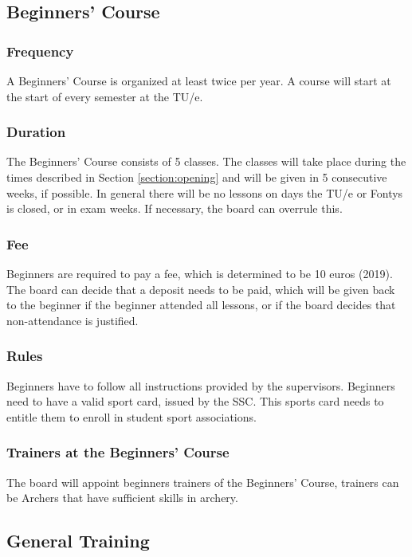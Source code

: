 \documentclass[a4paper]{article}
\begin{document}
\subsection{Beginners' Course}
\subsubsection{Frequency}
A { Beginners' Course} is organized at least twice per year. A course will start at the start of every semester at the { TU/e}.

\subsubsection{Duration}
The { Beginners' Course} consists of 5 classes. The classes will take place during the times described in Section \ref{section:opening} and will be given in 5 consecutive weeks, if possible. In general there will be no lessons on days the { TU/e} or Fontys is closed, or in exam weeks. If necessary, the board can overrule this.

\subsubsection{Fee}
{ Beginners} are required to pay a fee, which is determined to be 10 euros {\g (2019)}. The board can decide that a deposit needs to be paid, which will be given back to the { beginner} if the { beginner} attended all lessons, or if the board decides that non-attendance is justified.

\subsubsection{Rules}
{ Beginners} have to follow all instructions provided by the { supervisors}. { Beginners} need to have a valid sport card, issued by the { SSC}. This sports card needs to entitle them to enroll in student sport associations.

\subsubsection{Trainers at the Beginners' Course}
The board will appoint { beginners} trainers of the { Beginners' Course}, trainers can be { Archers} that have sufficient skills in archery.

\subsection{General Training}
\end{document}
